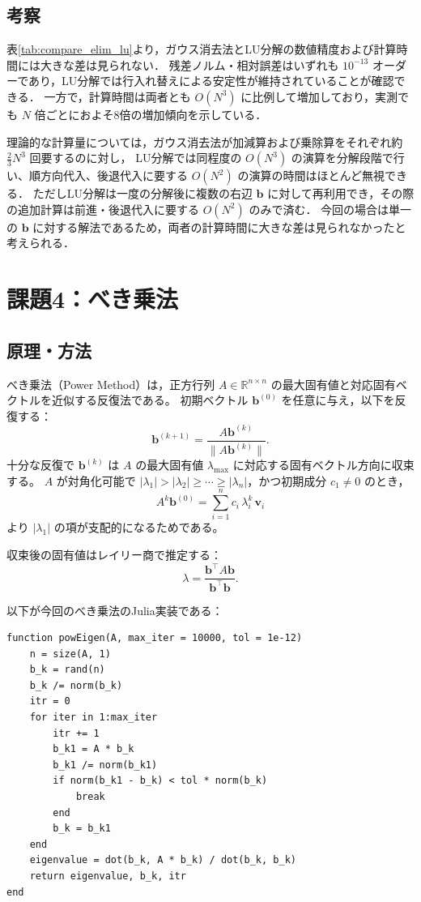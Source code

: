 \documentclass[a4paper,11pt]{ltjsarticle}
\begin{document}
\subsection{考察}
表\ref{tab:compare_elim_lu}より，ガウス消去法とLU分解の数値精度および計算時間には大きな差は見られない．
残差ノルム・相対誤差はいずれも $10^{-13}$ オーダーであり，LU分解では行入れ替えによる安定性が維持されていることが確認できる．
一方で，計算時間は両者とも $O(N^3)$ に比例して増加しており，実測でも $N$ 倍ごとにおよそ8倍の増加傾向を示している．

理論的な計算量については，ガウス消去法が加減算および乗除算をそれぞれ約 $\frac{2}{3}N^3$ 回要するのに対し，
LU分解では同程度の $O(N^3)$ の演算を分解段階で行い、順方向代入、後退代入に要する $O(N^2)$ の演算の時間はほとんど無視できる．
ただしLU分解は一度の分解後に複数の右辺 $\boldsymbol{b}$ に対して再利用でき，その際の追加計算は前進・後退代入に要する $O(N^2)$ のみで済む．
今回の場合は単一の $\boldsymbol{b}$ に対する解法であるため，両者の計算時間に大きな差は見られなかったと考えられる．
\section{課題4：べき乗法}
\subsection{原理・方法}

べき乗法（Power Method）は，正方行列 $A\in\mathbb{R}^{n\times n}$ の最大固有値と対応固有ベクトルを近似する反復法である。
初期ベクトル $\bm{b}^{(0)}$ を任意に与え，以下を反復する：
\[
  \bm{b}^{(k+1)}=\frac{A\bm{b}^{(k)}}{\|A\bm{b}^{(k)}\|}.
\]
十分な反復で $\bm{b}^{(k)}$ は $A$ の最大固有値 $\lambda_{\max}$ に対応する固有ベクトル方向に収束する。
$A$ が対角化可能で $|\lambda_1|>|\lambda_2|\ge\cdots\ge|\lambda_n|$，かつ初期成分 $c_1\neq0$ のとき，
\[
  A^k\bm{b}^{(0)}=\sum_{i=1}^n c_i\,\lambda_i^k\,\bm{v}_i
\]
より $|\lambda_1|$ の項が支配的になるためである。

収束後の固有値はレイリー商で推定する：
\[
  \lambda=\frac{\bm{b}^{\top}A\bm{b}}{\bm{b}^{\top}\bm{b}}.
\]

以下が今回のべき乗法のJulia実装である：
\begin{verbatim}
function powEigen(A, max_iter = 10000, tol = 1e-12)
    n = size(A, 1)
    b_k = rand(n)
    b_k /= norm(b_k)
    itr = 0
    for iter in 1:max_iter
        itr += 1
        b_k1 = A * b_k
        b_k1 /= norm(b_k1)
        if norm(b_k1 - b_k) < tol * norm(b_k)
            break
        end
        b_k = b_k1
    end
    eigenvalue = dot(b_k, A * b_k) / dot(b_k, b_k)
    return eigenvalue, b_k, itr
end
\end{verbatim}
\end{document}
